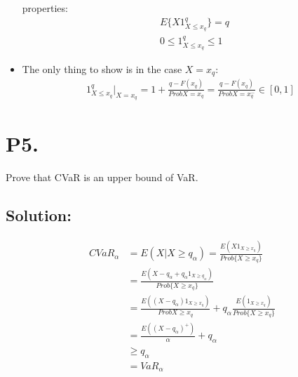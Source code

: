 \documentclass{article}
\theoremstyle{definition}
\theoremstyle{definition}
\theoremstyle{remark}
\begin{document}
\begin{itemize}
    properties:
    \begin{equation*}
        \begin{aligned}
            & E\{X 1_{X\leq x_q}^{q} \} = q \\
            & 0 \leq 1_{X\leq x_q}^{q} \leq 1
        \end{aligned}
    \end{equation*}  
    \item The only thing to show is in the case $X = x_q$:
    \begin{equation*}
        \begin{aligned}
            1_{X\leq x_q}^{q} |_{X = x_q}= 1 + \frac{q-F(x_q)}{Prob{X = x_q}} = \frac{q-F(x_q)}{Prob{X = x_q^-}} \in [0,1]
        \end{aligned}
    \end{equation*} 
\end{itemize}



\section*{P5.}
Prove that CVaR is an upper bound of VaR.
\subsection*{Solution:}
\begin{equation*}
    \begin{aligned}
        CVaR_{\alpha} &= E(X|X\geq q_{\alpha}) = \frac{E(X1_{X \geq x_q})}
                        {Prob\{X \geq x_q\}}  \\ 
                      &= \frac{E(X-q_{\alpha}+q_{\alpha}1_{X\geq q_{\alpha}})}{Prob\{X \geq x_q\}} \\
                      &= \frac{E((X- q_{\alpha})1_{X \geq x_q})}
                      {Prob{X \geq x_q}}  + q_{\alpha} \frac{E(1_{X \geq x_q})}{Prob\{X \geq x_q\}}\\ 
                      &= \frac{E((X-q_{\alpha})^+)}{\alpha} + q_{\alpha} \\
                      &\geq q_{\alpha} \\
                      &= VaR_{\alpha}
    \end{aligned}
\end{equation*}  
\end{document}
